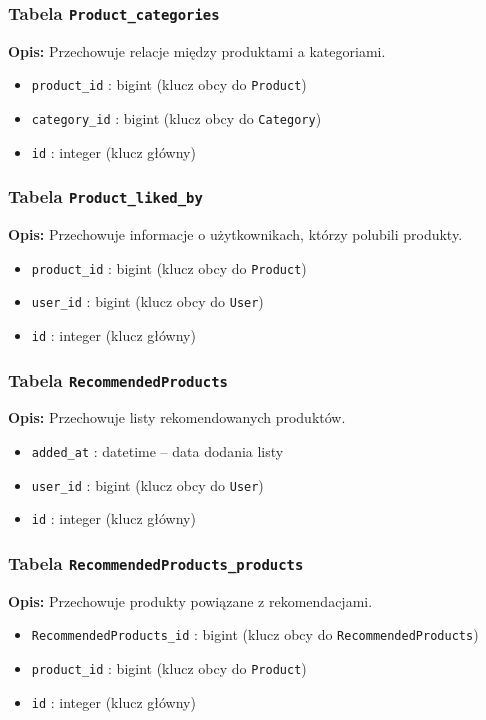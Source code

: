 \documentclass[12pt,a4paper,oneside]{article}
\theoremstyle{definition}
\numberwithin{equation}{section}
\begin{document}
\subsubsection*{Tabela \texttt{Product\string_categories}}
\textbf{Opis:} Przechowuje relacje między produktami a kategoriami.
\begin{itemize}
    \item \texttt{product\string_id} : bigint (klucz obcy do \texttt{Product})
    \item \texttt{category\string_id} : bigint (klucz obcy do \texttt{Category})
    \item \texttt{id} : integer (klucz główny)
\end{itemize}

\subsubsection*{Tabela \texttt{Product\string_liked\string_by}}
\textbf{Opis:} Przechowuje informacje o użytkownikach, którzy polubili produkty.
\begin{itemize}
    \item \texttt{product\string_id} : bigint (klucz obcy do \texttt{Product})
    \item \texttt{user\string_id} : bigint (klucz obcy do \texttt{User})
    \item \texttt{id} : integer (klucz główny)
\end{itemize}

\subsubsection*{Tabela \texttt{RecommendedProducts}}
\textbf{Opis:} Przechowuje listy rekomendowanych produktów.
\begin{itemize}
    \item \texttt{added\string_at} : datetime – data dodania listy
    \item \texttt{user\string_id} : bigint (klucz obcy do \texttt{User})
    \item \texttt{id} : integer (klucz główny)
\end{itemize}

\subsubsection*{Tabela \texttt{RecommendedProducts\string_products}}
\textbf{Opis:} Przechowuje produkty powi\k{a}zane z rekomendacjami.
\begin{itemize}
    \item \texttt{RecommendedProducts\string_id} : bigint (klucz obcy do \texttt{RecommendedProducts})
    \item \texttt{product\string_id} : bigint (klucz obcy do \texttt{Product})
    \item \texttt{id} : integer (klucz główny)
\end{itemize}
\end{document}
